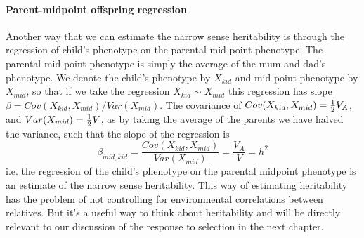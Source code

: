 \paragraph{Parent-midpoint offspring regression} 
Another way that we can estimate the narrow sense heritability is
through the regression of child's phenotype on the parental mid-point
phenotype. The parental mid-point phenotype is simply the average of
the mum and dad's phenotype. We denote the child's phenotype by $X_{kid}$ and mid-point
phenotype by $X_{mid}$, so that if we take the regression $X_{kid} \sim X_{mid}$ this
regression has slope $\beta = Cov(X_{kid},X_{mid})/Var(X_{mid})$.
The covariance of $Cov(X_{kid},X_{mid})=\tfrac{1}{2}
V_A$, and $Var(X_{mid}) = \tfrac{1}{2} V$, as by taking the average of the
parents we have halved the variance, such that the slope of the
regression is
\begin{equation}
\beta_{mid,kid}= \frac{Cov(X_{kid},X_{mid})}{Var(X_{mid})} = \frac{V_A}{V} = h^2
\end{equation}
i.e. the regression of the child's phenotype on the parental midpoint
phenotype is an estimate of the narrow sense
heritability. This way of estimating heritability has the problem of not controlling for environmental correlations between relatives. But it's a useful way to think about heritability and will be directly relevant to our discussion of the response to selection in the next chapter.\\

